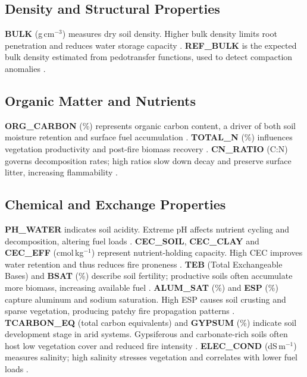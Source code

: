 \subsection*{Density and Structural Properties}
\textbf{BULK} (g\,cm$^{-3}$) measures dry soil density. Higher bulk density limits
root penetration and reduces water storage capacity \citep{Certini2005}.  
\textbf{REF\_BULK} is the expected bulk density estimated from pedotransfer
functions, used to detect compaction anomalies \citep{Reynolds2018}.

\subsection*{Organic Matter and Nutrients}
\textbf{ORG\_CARBON} (\%) represents organic carbon content, a driver of both
soil moisture retention and surface fuel accumulation \citep{DeGroot2009}.  
\textbf{TOTAL\_N} (\%) influences vegetation productivity and post-fire biomass
recovery \citep{Pausas2012}.  
\textbf{CN\_RATIO} (C:N) governs decomposition rates; high ratios slow down decay
and preserve surface litter, increasing flammability \citep{Fernandez2018}.

\subsection*{Chemical and Exchange Properties}
\textbf{PH\_WATER} indicates soil acidity. Extreme pH affects nutrient cycling
and decomposition, altering fuel loads \citep{Certini2005b}.  
\textbf{CEC\_SOIL}, \textbf{CEC\_CLAY} and \textbf{CEC\_EFF} (cmol\,kg$^{-1}$)
represent nutrient-holding capacity. High CEC improves water retention and thus
reduces fire proneness \citep{Brady2017,Jenny1941}.  
\textbf{TEB} (Total Exchangeable Bases) and \textbf{BSAT} (\%) describe soil
fertility; productive soils often accumulate more biomass, increasing available
fuel \citep{Archibald2013}.  
\textbf{ALUM\_SAT} (\%) and \textbf{ESP} (\%) capture aluminum and sodium
saturation. High ESP causes soil crusting and sparse vegetation, producing
patchy fire propagation patterns \citep{Qadir2014}.  
\textbf{TCARBON\_EQ} (total carbon equivalents) and \textbf{GYPSUM} (\%) indicate
soil development stage in arid systems. Gypsiferous and carbonate-rich soils
often host low vegetation cover and reduced fire intensity \citep{Herrero2009}.  
\textbf{ELEC\_COND} (dS\,m$^{-1}$) measures salinity; high salinity stresses
vegetation and correlates with lower fuel loads \citep{RuizSinoga2012}.

